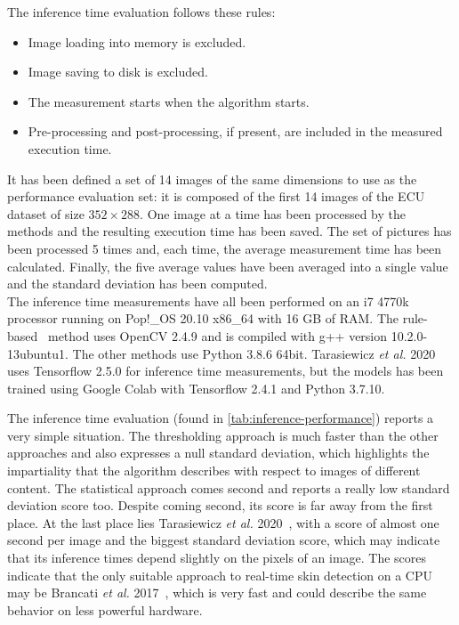 The inference time evaluation follows these rules:
\begin{itemize}
    \item Image loading into memory is excluded.
    \item Image saving to disk is excluded.
    \item The measurement starts when the algorithm starts.
    \item Pre-processing and post-processing, if present, are included in the measured execution time.
\end{itemize}
It has been defined a set of 14 images of the same dimensions to use as the performance evaluation set: it is composed of the first 14 images of the ECU dataset of size $352\times288$.
One image at a time has been processed by the methods and the resulting execution time has been saved.
The set of pictures has been processed 5 times and, each time, the average measurement time has been calculated.
Finally, the five average values have been averaged into a single value and the standard deviation has been computed.\\
The inference time measurements have all been performed on an i7 4770k processor running on Pop!\_OS 20.10 x86\_64 with 16 GB of RAM.
The rule-based~\cite{brancati2017human} method uses OpenCV 2.4.9 and is compiled with g++ version 10.2.0-13ubuntu1.
The other methods use Python 3.8.6 64bit. Tarasiewicz \textit{et al.} 2020~\cite{tarasiewicz2020skinny} uses Tensorflow 2.5.0 for inference time measurements, but the models has been trained using Google Colab with Tensorflow 2.4.1 and Python 3.7.10.

The inference time evaluation (found in \autoref{tab:inference-performance}) reports a very simple situation.
The thresholding approach is much faster than the other approaches and also expresses a null standard deviation, which highlights the impartiality that the algorithm describes with respect to images of different content.
The statistical approach comes second and reports a really low standard deviation score too.
Despite coming second, its score is far away from the first place.
At the last place lies Tarasiewicz \textit{et al.} 2020~\cite{tarasiewicz2020skinny}, with a score of almost one second per image and the biggest standard deviation score, which may indicate that its inference times depend slightly on the pixels of an image.
The scores indicate that the only suitable approach to real-time skin detection on a CPU may be Brancati \textit{et al.} 2017~\cite{brancati2017human}, which is very fast and could describe the same behavior on less powerful hardware.


